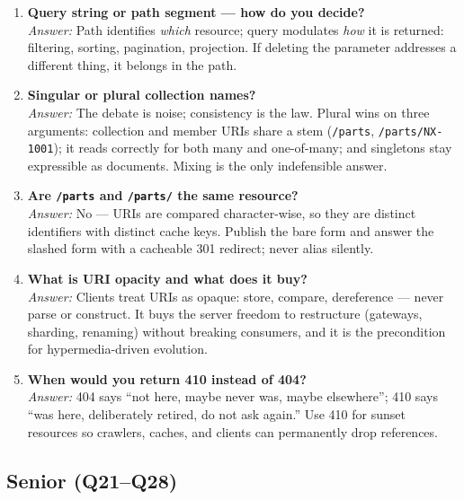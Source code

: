 \begin{enumerate}[label=\textbf{Q\arabic*.}, leftmargin=3.2em, itemsep=0.6em, resume]
        collections.
  \item \textbf{Query string or path segment --- how do you decide?}\\
        \emph{Answer:} Path identifies \emph{which} resource; query modulates
        \emph{how} it is returned: filtering, sorting, pagination, projection.
        If deleting the parameter addresses a different thing, it belongs in
        the path.
  \item \textbf{Singular or plural collection names?}\\
        \emph{Answer:} The debate is noise; consistency is the law. Plural wins
        on three arguments: collection and member URIs share a stem
        (\texttt{/parts}, \texttt{/parts/NX-1001}); it reads correctly for both
        many and one-of-many; and singletons stay expressible as documents.
        Mixing is the only indefensible answer.
  \item \textbf{Are \texttt{/parts} and \texttt{/parts/} the same resource?}\\
        \emph{Answer:} No --- URIs are compared character-wise, so they are
        distinct identifiers with distinct cache keys. Publish the bare form
        and answer the slashed form with a cacheable 301 redirect; never alias
        silently.
  \item \textbf{What is URI opacity and what does it buy?}\\
        \emph{Answer:} Clients treat URIs as opaque: store, compare,
        dereference --- never parse or construct. It buys the server freedom to
        restructure (gateways, sharding, renaming) without breaking consumers,
        and it is the precondition for hypermedia-driven evolution.
  \item \textbf{When would you return 410 instead of 404?}\\
        \emph{Answer:} 404 says ``not here, maybe never was, maybe
        elsewhere''; 410 says ``was here, deliberately retired, do not ask
        again.'' Use 410 for sunset resources so crawlers, caches, and clients
        can permanently drop references.
\end{enumerate}

\subsection{Senior (Q21--Q28)}

